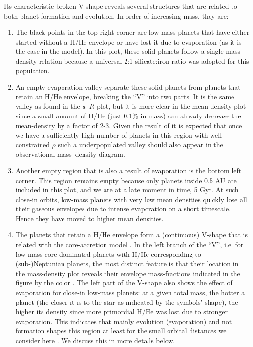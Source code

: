 \documentclass[]{emulateapj}
\begin{document}
Its {characteristic broken V-shape \citep{Rauer2013} reveals} several structures that are related to both planet formation and evolution. In order of increasing mass, they are:
\begin{enumerate}
\item The black points in the top right corner are low-mass planets that have either started without a H/He envelope or have lost it due to evaporation (as it is the case in the model). In this plot, these solid planets follow a single mass-density relation because a universal 2:1 silicate:iron ratio was adopted for this population. 

\item An empty evaporation valley separate these solid planets from planets that retain an H/He envelope{, breaking the ``V'' into two parts}. It is the same valley as found in the $a$--$R$ plot, but it is more clear in the mean-density plot since a  small amount of H/He (just 0.1\% in mass) can already decrease the mean-density by a factor of 2-3. Given the result of \citet{Fulton2017} it is expected that once we have a sufficiently high number of planets in this region with well constrained $\bar{\rho}$ such a underpopulated valley should also appear in the observational mass--density diagram.
 
\item Another empty region that is also a result of evaporation is the bottom left corner. This region remains empty because only planets inside 0.5 AU are included in this plot, and we are at a late moment in time, 5 Gyr. At such close-in orbits, low-mass planets with very low mean densities  quickly lose all their gaseous envelopes due to intense evaporation on a short timescale. Hence they have moved to higher mean densities.

\item The planets that retain a H/He envelope form a {(continuous)} V-shape that is related with the core-accretion model \citep{Rauer2013,Baruteau2016}. In the left branch of the ``V'', i.e. for low-mass core-dominated planets with H/He corresponding to (sub-)Neptunian planets, the most distinct feature is that their location in the mass-density plot reveals their envelope mass-fractions indicated in the figure by the color \citep{Lopez2014,Jin2014}. The left part of the V-shape also shows the effect of evaporation for close-in low-mass planets: at a given total mass, the hotter a planet (the closer it is to the star as indicated by the symbols' shape), the higher its density since more primordial H/He was lost due to stronger evaporation. This indicates that mainly evolution (evaporation) and not formation shapes this region at least for the small orbital distances we consider here \citep{Owen2013}. We discuss this in more details below.


\end{enumerate}
\end{document}
